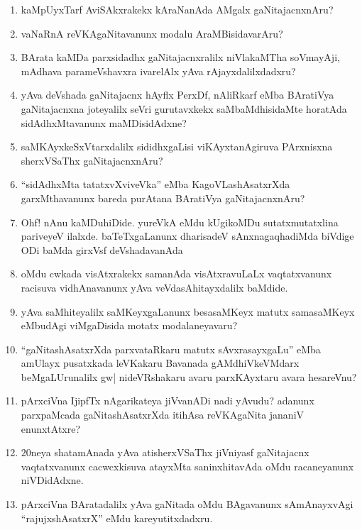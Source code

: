 \begin{enumerate}
\item kaMpUyxTarf AviSAkxrakekx kAraNanAda AMgalx gaNitajacnxnAru?
  
 \item vaNaRnA reVKAgaNitavanunx modalu AraMBisidavarAru?

\item BArata kaMDa parxsidadhx gaNitajacnxralilx niVlakaMTha soVmayAji, mAdhava parameVshavxra ivarelAlx yAva rAjayxdalilxdadxru?
  
\item yAva deVshada gaNitajacnx hAyflx PerxDf, nAliRkarf eMba BAratiVya gaNitajacnxna joteyalilx seVri gurutavxkekx saMbaMdhisidaMte horatAda sidAdhxMtavanunx maMDisidAdxne?
  
\item saMKAyxkeSxVtarxdalilx sididhxgaLisi viKAyxtanAgiruva PArxnisxna sherxVSaThx gaNitajacnxnAru?
  
\item ``sidAdhxMta tatatxvXviveVka'' eMba KagoVLashAsatxrXda garxMthavanunx bareda purAtana BAratiVya gaNitajacnxnAru?
  
\item Ohf! nAnu kaMDuhiDide. yureVkA eMdu kUgikoMDu sutatxmutatxlina pariveyeV ilalxde. baTeTxgaLanunx dharisadeV sAnxnagaqhadiMda  biVdige ODi baMda girxVsf deVshadavanAda
  
\item oMdu cwkada visAtxrakekx samanAda visAtxravuLaLx vaqtatxvanunx racisuva vidhAnavanunx yAva veVdasAhitayxdalilx baMdide.
  
  \eject
  
\item yAva saMhiteyalilx saMKeyxgaLanunx besasaMKeyx matutx samasaMKeyx eMbudAgi viMgaDisida motatx modalaneyavaru?
  
\item ``gaNitashAsatxrXda parxvataRkaru matutx sAvxrasayxgaLu'' eMba amUlayx pusatxkada leVKakaru Bavanada gAMdhiVkeVMdarx beMgaLUrunalilx gw| nideVRshakaru avaru parxKAyxtaru avara hesareVnu?

\item pArxciVna IjipfTx nAgarikateya jiVvanADi nadi yAvudu? adanunx parxpaMcada gaNitashAsatxrXda itihAsa reVKAgaNita jananiV enunxtAtxre?
  
\item $20$neya shatamAnada yAva atisherxVSaThx jiVniyasf gaNitajacnx vaqtatxvanunx cacwcxkisuva atayxMta saninxhitavAda oMdu racaneyanunx niVDidAdxne.
  
\item pArxciVna BAratadalilx yAva gaNitada oMdu BAgavanunx sAmAnayxvAgi ``rajujxshAsatxrX'' eMdu kareyutitxdadxru.
  

\end{enumerate}
